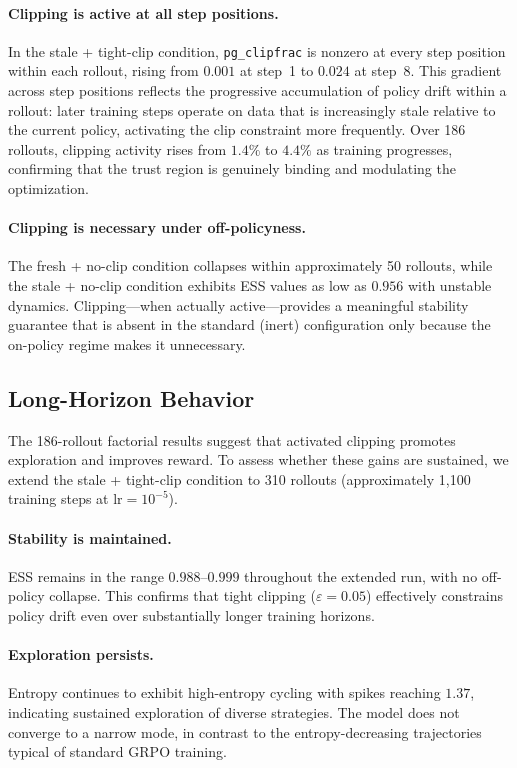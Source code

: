 \paragraph{Clipping is active at all step positions.}
In the stale + tight-clip condition, \texttt{pg\_clipfrac} is nonzero at every step position within each rollout, rising from $0.001$ at step~1 to $0.024$ at step~8.
This gradient across step positions reflects the progressive accumulation of policy drift within a rollout: later training steps operate on data that is increasingly stale relative to the current policy, activating the clip constraint more frequently.
Over 186 rollouts, clipping activity rises from $1.4\%$ to $4.4\%$ as training progresses, confirming that the trust region is genuinely binding and modulating the optimization.

\paragraph{Clipping is necessary under off-policyness.}
The fresh + no-clip condition collapses within approximately 50 rollouts, while the stale + no-clip condition exhibits ESS values as low as $0.956$ with unstable dynamics.
Clipping---when actually active---provides a meaningful stability guarantee that is absent in the standard (inert) configuration only because the on-policy regime makes it unnecessary.

\subsection{Long-Horizon Behavior}
\label{sec:long-horizon}

The 186-rollout factorial results suggest that activated clipping promotes exploration and improves reward.
To assess whether these gains are sustained, we extend the stale + tight-clip condition to 310 rollouts (approximately 1,100 training steps at $\text{lr} = 10^{-5}$).

\paragraph{Stability is maintained.}
ESS remains in the range $0.988$--$0.999$ throughout the extended run, with no off-policy collapse.
This confirms that tight clipping ($\varepsilon = 0.05$) effectively constrains policy drift even over substantially longer training horizons.

\paragraph{Exploration persists.}
Entropy continues to exhibit high-entropy cycling with spikes reaching $1.37$, indicating sustained exploration of diverse strategies.
The model does not converge to a narrow mode, in contrast to the entropy-decreasing trajectories typical of standard GRPO training.

